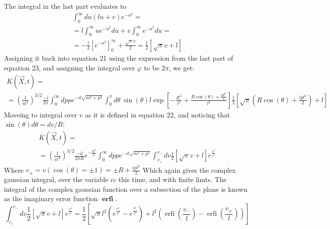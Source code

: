 \documentclass{article}
\DeclareMathOperator{\erfi}{erfi}
\begin{document}
The integral in the last part evaluates to
\begin{equation}
\begin{gathered}
    \int_0^\infty du (lu + v) e^{-u^2} = \\
    = l\int_0^\infty u e^{-u^2} du + v \int_0^\infty e^{-u^2} du = \\
    = -\frac{l}{2} \left[e^{-u^2}\right]_0^\infty + \frac{\sqrt{\pi}v}{2} = 
    \frac{1}{2}\left[\sqrt{\pi}v + l\right]
\end{gathered}
\end{equation}
Assigning it back into equation 21 using the expression from the last part of equation 23, and assigning the integral over $\varphi$ to be $2\pi$, we get:
\begin{equation}
\begin{gathered}
    \overline{K}\left(\vec{X}, t\right) =  \\
    = \left(\frac{1}{\pi l^2}\right)^{3/2} \frac{-i}{2\pi}
    \int_{0}^{\infty} dp p e^{-it\sqrt{m^2 + p^2}}
    \int_0^{\pi} d\theta
    \ \sin(\theta)
    l \exp[-\frac{R^2}{l^2} + \frac{R\cos(\theta) + \frac{ipl^2}{2}}{l^2}]
    \frac{1}{2}\left[\sqrt{\pi}\left(R\cos(\theta) + \frac{ipl^2}{2}\right) + l\right]
\end{gathered}
\end{equation}
Moveing to integral over $v$ as it is defined in equation 22, and noticing that $\sin(\theta)d\theta = dv/R$:
\begin{equation}
\begin{gathered}
    \overline{K}\left(\vec{X}, t\right) =  \\
    = \left(\frac{1}{\pi l^2}\right)^{3/2} \frac{-il}{2\pi R}
    e^{-\frac{R^2}{l^2}}
    \int_{0}^{\infty} dp p e^{-it\sqrt{m^2 + p^2}}
    \int_{v_{+}}^{v_{-}} dv
    \frac{1}{2}\left[\sqrt{\pi}v + l\right]e^{\frac{v^2}{l^2}}
\end{gathered}
\end{equation}
Where $v_{\pm} = v(\cos(\theta) = \pm 1) = \pm R + \frac{ipl^2}{2}$ Which again gives the complex gaussian integral, over the variable $iv$ this time, and with finite limts. The integral of the complex gaussian function over a subsection of the plane is known as the imaginary error function $\boldsymbol{\erfi}$.
\begin{equation}
    \int_{v_{+}}^{v_{-}} dv
    \frac{1}{2}\left[\sqrt{\pi}v + l\right]e^{\frac{v^2}{l^2}} = \frac{1}{2}\left[
        \sqrt{\pi}l^2\left(e^\frac{v_{-}^2}{l^2} - e^\frac{v_{+}^2}{l^2}\right) +
        l^2 \left(\erfi\left(\frac{v_{-}}{l}\right) - \erfi\left(\frac{v_{+}}{l}\right)\right)
    \right]
\end{equation}
\end{document}
